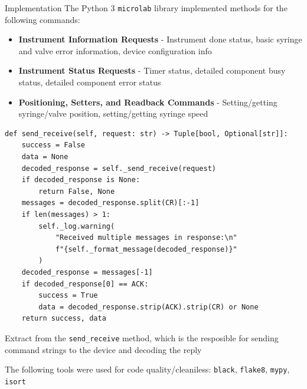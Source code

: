\documentclass[a0paper,landscape,fontscale=0.32]{baposter}
\begin{document}
\begin{poster}
\begin{posterbox}[name=implementation,column=1,span=2]{Implementation}
The Python 3 \texttt{microlab} library implemented methods for the following commands:
 \begin{itemize}
     \item \textbf{Instrument Information Requests} - Instrument done status, basic syringe and valve error
         information, device configuration info
     \item \textbf{Instrument Status Requests} - Timer status, detailed component busy status, detailed
         component error status
     \item \textbf{Positioning, Setters, and Readback Commands} - Setting/getting
         syringe/valve position, setting/getting syringe speed 
\end{itemize}
\vspace{-1.5em}
\begin{listing}[H]
    \begin{verbatim}
def send_receive(self, request: str) -> Tuple[bool, Optional[str]]:
    success = False
    data = None
    decoded_response = self._send_receive(request)
    if decoded_response is None:
        return False, None
    messages = decoded_response.split(CR)[:-1]
    if len(messages) > 1:
        self._log.warning(
            "Received multiple messages in response:\n"
            f"{self._format_message(decoded_response)}"
        )
    decoded_response = messages[-1]
    if decoded_response[0] == ACK:
        success = True
        data = decoded_response.strip(ACK).strip(CR) or None
    return success, data
\end{verbatim}
    \caption{Extract from the \texttt{send\_receive} method, which is the resposible for sending command
    strings to the device and decoding the reply}
\end{listing}
    The following tools were used for code quality/cleaniless: \texttt{black}, \texttt{flake8}, \texttt{mypy}, \texttt{isort}

\end{posterbox}
\end{poster}
\end{document}
